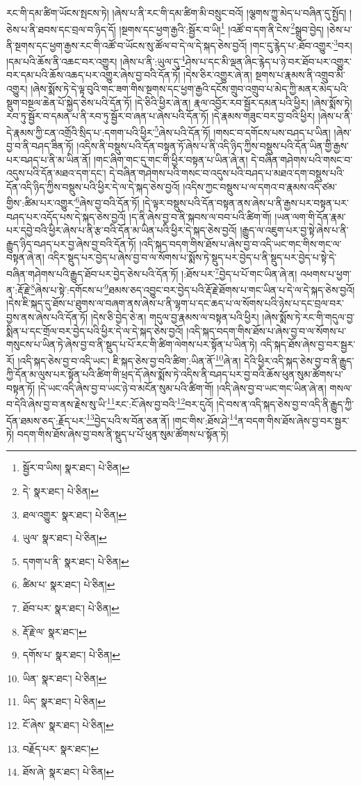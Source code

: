 རང་གི་དམ་ཚིག་ཡོངས་སྤངས་ཏེ། །ཞེས་པ་ནི་རང་གི་དམ་ཚིག་མི་བསྲུང་བའོ། །ལྕགས་ཀྱུ་མེད་པ་བཞིན་དུ་སྤྱོད། །ཅེས་པ་ནི་ཐབས་དང་བྲལ་བ་ཉིད་དོ། །སྔགས་དང་ཕྱག་རྒྱའི་:སྦྱོར་བ་ཡི།\footnote{སྦྱོར་བ་ཡིས།  སྣར་ཐང་།  པེ་ཅིན། } །འཚོ་བ་དག་ནི་ངེས་\footnote{དེ་  སྣར་ཐང་།  པེ་ཅིན། }སྒྲུབ་བྱེད། །ཅེས་པ་ནི་སྔགས་དང་ཕྱག་རྒྱས་རང་གི་འཚོ་བ་ཡོངས་སུ་ཚོལ་བ་དེ་ལ་དེ་སྐད་ཅེས་བྱའོ། །གང་དུ་རྙེད་པ་:ཐོབ་འགྱུར་\footnote{ཐལ་འགྱུར་  སྣར་ཐང་།  པེ་ཅིན། }བར། །དམ་པའི་ཆོས་ནི་འཆང་བར་འགྱུར། །ཞེས་པ་ནི་:ཡུལ་དུ་\footnote{ཡུལ་  སྣར་ཐང་།  པེ་ཅིན། }ཤེས་པ་དང་མི་ལྡན་ཞིང་རྙེད་པ་ཉེ་བར་ཐོབ་པར་འགྱུར་བར་དམ་པའི་ཆོས་འཆད་པར་འགྱུར་ཞེས་བྱ་བའི་དོན་ཏོ། །དེས་ཅིར་འགྱུར་ཞེ་ན། སྔགས་པ་རྣམས་ནི་འགྲུབ་མི་འགྱུར། །ཞེས་སྨོས་ཏེ་དེ་ལྟ་བུའི་གང་ཟག་གིས་སྔགས་དང་ཕྱག་རྒྱའི་དངོས་གྲུབ་འགྲུབ་པ་མེད་ཀྱི་མནར་མེད་པའི་སྡུག་བསྔལ་ཆེན་པོ་སྐྱེད་ཅེས་པའི་དོན་ཏོ། །དེ་ཅིའི་ཕྱིར་ཞེ་ན། རྣལ་འབྱོར་རབ་སྦྱོར་དམན་པའི་ཕྱིར། །ཞེས་སྨོས་ཏེ། རབ་ཏུ་སྦྱོར་བ་དམན་པ་ནི་རབ་ཏུ་སྦྱོར་བ་ཞན་པ་ཞེས་པའི་དོན་ཏོ། །དེ་རྣམས་གཟུང་བར་བྱ་བའི་ཕྱིར། །ཞེས་པ་ནི་དེ་རྣམས་ཀྱི་ངན་འགྲོའི་སྲིད་པ་:དགག་པའི་ཕྱིར་\footnote{དགག་པ་ནི་  སྣར་ཐང་།  པེ་ཅིན། }ཞེས་པའི་དོན་ཏོ། །གསང་བ་དགོངས་པས་བཤད་པ་ཡིན། །ཞེས་བྱ་བ་ནི་བཤད་ཟིན་ཏོ། །འདིས་ནི་བསྡུས་པའི་དོན་བསྟན་ཏོ་ཞེས་པ་ནི་འདི་ཉིད་ཀྱིས་བསྡུས་པའི་དོན་ཡིན་གྱི་རྒྱས་པར་བཤད་པ་ནི་མ་ཡིན་ནོ། །གང་ཞིག་གང་དུ་གང་གི་ཕྱིར་བསྟན་པ་ཡིན་ཞེ་ན། དེ་བཞིན་གཤེགས་པའི་གསང་བ་འདུས་པའི་དོན་མཐའ་དག་དང་། དེ་བཞིན་གཤེགས་པའི་གསང་བ་འདུས་པའི་བཤད་པ་མཐའ་དག་བསྡུས་པའི་དོན་འདི་ཉིད་ཀྱིས་བསྡུས་པའི་ཕྱིར་དེ་ལ་དེ་སྐད་ཅེས་བྱའོ། །འདིས་ཀྱང་བསྡུས་པ་ལ་དགའ་བ་རྣམས་འདི་ཙམ་གྱིས་:ཚིམ་པར་འགྱུར་\footnote{ཚིམ་པ་  སྣར་ཐང་།  པེ་ཅིན། }ཞེས་བྱ་བའི་དོན་ཏོ། །དེ་ལྟར་བསྡུས་པའི་དོན་བསྟན་ནས་ཞེས་པ་ནི་རྒྱས་པར་བསྟན་པར་བཤད་པར་འདོད་པས་དེ་སྐད་ཅེས་བྱའོ། །ད་ནི་ཞེས་བྱ་བ་ནི་སྐབས་ལ་བབ་པའི་ཚིག་གོ། །ཡན་ལག་གི་དོན་རྣམ་པར་དབྱེ་བའི་ཕྱིར་ཞེས་པ་ནི་རྩ་བའི་དོན་མ་ཡིན་པའི་ཕྱིར་དེ་སྐད་ཅེས་བྱའོ། །རྒྱུད་ལ་འཇུག་པར་བྱ་སྟེ་ཞེས་པ་ནི་རྒྱུད་ཉིད་བཤད་པར་བྱ་ཞེས་བྱ་བའི་དོན་ཏོ། །འདི་སྐད་བདག་གིས་ཐོས་པ་ཞེས་བྱ་བ་འདི་ཡང་གང་གིས་གང་ལ་བསྟན་ཞེ་ན། འདིར་སྡུད་པར་བྱེད་པ་ཞེས་བྱ་བ་ལ་སོགས་པ་སྨོས་ཏེ་སྡུད་པར་བྱེད་པ་ནི་སྡུད་པར་བྱེད་པ་སྟེ་དེ་བཞིན་གཤེགས་པའི་རྒྱུད་ཐོབ་པར་བྱེད་ཅེས་པའི་དོན་ཏོ། །:ཐོས་པར་\footnote{ཐོབ་པར་  སྣར་ཐང་།  པེ་ཅིན། }བྱེད་པ་པོ་གང་ཡིན་ཞེ་ན། འཕགས་པ་ཕྱག་ན་:རྡོ་རྗེ་\footnote{རྡོ་རྗེ་ལ་  སྣར་ཐང་། }ཞེས་པ་སྟེ་:དགོངས་པ་\footnote{དགོས་པ་  སྣར་ཐང་།  པེ་ཅིན། }ཐམས་ཅད་འབྱུང་བར་བྱེད་པའི་རྡོ་རྗེ་ཐོགས་པ་གང་ཡིན་པ་དེ་ལ་དེ་སྐད་ཅེས་བྱའོ། །དེས་ཇི་སྐད་དུ་ཐོས་པ་ཐུགས་ལ་བཞག་ནས་ཞེས་པ་ནི་ལྷག་པ་དང་ཆད་པ་ལ་སོགས་པའི་ཉེས་པ་དང་བྲལ་བར་བྱས་ནས་ཞེས་པའི་དོན་ཏོ། །དེས་ཅི་བྱེད་ཅེ་ན། གདུལ་བྱ་རྣམས་ལ་བསྟན་པའི་ཕྱིར། །ཞེས་སྨོས་ཏེ་རང་གི་གདུལ་བྱ་སྨིན་པ་དང་གྲོལ་བར་བྱེད་པའི་ཕྱིར་དེ་ལ་དེ་སྐད་ཅེས་བྱའོ། །འདི་སྐད་བདག་གིས་ཐོས་པ་ཞེས་བྱ་བ་ལ་སོགས་པ་གསུངས་པ་ཡིན་ཏེ་ཞེས་བྱ་བ་ནི་སྡུད་པ་པོ་རང་གི་ཚིག་ལེགས་པར་སྟོན་པ་ཡིན་ཏེ། འདི་སྐད་ཐོས་ཞེས་བྱ་བར་སྦྱར་རོ། །འདི་སྐད་ཅེས་བྱ་བ་འདི་ཡང་། ཇི་སྐད་ཅེས་བྱ་བའི་ཚིག་:ཡིན་ནོ་\footnote{ཡིན་  སྣར་ཐང་།  པེ་ཅིན། }ཞེ་ན། དེའི་ཕྱིར་འདི་སྐད་ཅེས་བྱ་བ་ནི་རྒྱུད་ཀྱི་དོན་མ་ལུས་པར་སྟོན་པའི་ཚིག་གི་ཕྲད་དོ་ཞེས་སྨོས་ཏེ་འདིས་ནི་བཤད་པར་བྱ་བའི་ཆོས་ཕུན་སུམ་ཚོགས་པ་བསྟན་ཏོ། །དེ་ཡང་འདི་ཞེས་བྱ་བ་ཡང་ཉེ་བ་མངོན་སུམ་པའི་ཚིག་གོ། །འདི་ཞེས་བྱ་བ་ཡང་གང་ཡིན་ཞེ་ན། གསལ་བ་དེའི་ཞེས་བྱ་བ་ནས་རྗེས་སུ་ཡི་\footnote{ཡིད་  སྣར་ཐང་།  པེ་ཅིན། }རང་:ངོ་ཞེས་བྱ་བའི་\footnote{ངོ་ཞེས་  སྣར་ཐང་།  པེ་ཅིན། }བར་དུའོ། །དེ་བས་ན་འདི་སྐད་ཅེས་བྱ་བ་འདི་ནི་རྒྱུད་ཀྱི་དོན་ཐམས་ཅད་:རྗོད་པར་\footnote{བརྗོད་པར་  སྣར་ཐང་། }བྱེད་པའི་ས་བོན་ཅན་ནོ། །གང་གིས་:ཐོས་ཤེ་\footnote{ཐོས་ཞེ་  སྣར་ཐང་།  པེ་ཅིན། }ན་བདག་གིས་ཐོས་ཞེས་བྱ་བར་སྦྱར་ཏེ། བདག་གིས་ཐོས་ཞེས་བྱ་བས་ནི་སྡུད་པ་པོ་ཕུན་སུམ་ཚོགས་པ་སྟོན་ཏེ། 